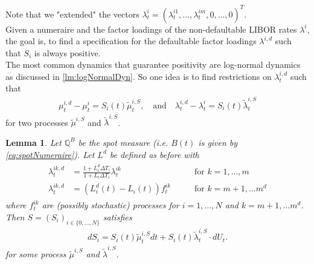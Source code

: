 \documentclass[12pt]{article}
\newtheorem{lemma}[theorem]{Lemma}
\begin{document}
	Note that we "extended" the vectors $\lambda^{i}_t = (\lambda^{i 1}_t, ..., \lambda^{i m}_t, 0, ..., 0)^T$.\\
	Given a numeraire and the factor loadings of the non-defaultable LIBOR rates $\lambda^i$, the goal is, to find a specification for the defaultable factor loadings $\lambda^{i,d}$ such that $S_i$ is always positive.\\
	The most common dynamics that guarantee positivity are log-normal dynamics as discussed in \cref{lm:logNormalDyn}. So one idea is to find restrictions on $\lambda^{i,d}_t$ such that 
	\begin{align*}
		\mu^{i,d}_t - \mu^{i}_t = S_i(t)\tilde{\mu}^{i,S}_t, \quad \text{and} 
		\quad \lambda^{i,d}_t - \lambda^{i}_t = S_i(t)\tilde{\lambda}^{i,S}_t
	\end{align*}
	for two processes $\tilde{\mu}^{i,S}$ and $\tilde{\lambda}^{i,S}$.
	\begin{lemma}\label{lem:flguaranteeingpositivespreads}
		Let $\mathbb{Q}^B$ be the spot measure (i.e. $B(t)$ is given by \cref{eq:spotNumeraire}).
		Let $L^d$ be defined as before with 
		\begin{align}
			\begin{aligned}
				\lambda^{i k,d}_t &= \frac{1+L^d_i\Delta T_i}{1+L_i\Delta T_i} \lambda^{i k}_t \quad \quad & \text{for } k= 1,...,m\\
				\lambda^{i k,d}_t &= \left(L^d_i(t) - L_i(t)\right)f^{i k}_t \quad \quad & \text{for } k= m+1, ... m^d
			\end{aligned}
		\end{align}
		where $f^{i k}_t$ are (possibly stochastic) processes for $i=1, ..., N$ and $k= m+1, ... m^d$.\\
		Then $S = (S_i)_{i\in \{0, ..., N\}}$ satisfies 
		\begin{align*}
			dS_i = S_i(t)\tilde{\mu}^{i,S}_t dt + S_i(t)\tilde{\lambda}^{i,S}_t \cdot dU_t.
		\end{align*}
		for some process $\tilde{\mu}^{i,S}$ and $\tilde{\lambda}^{i,S}$.
	\end{lemma}
\end{document}
